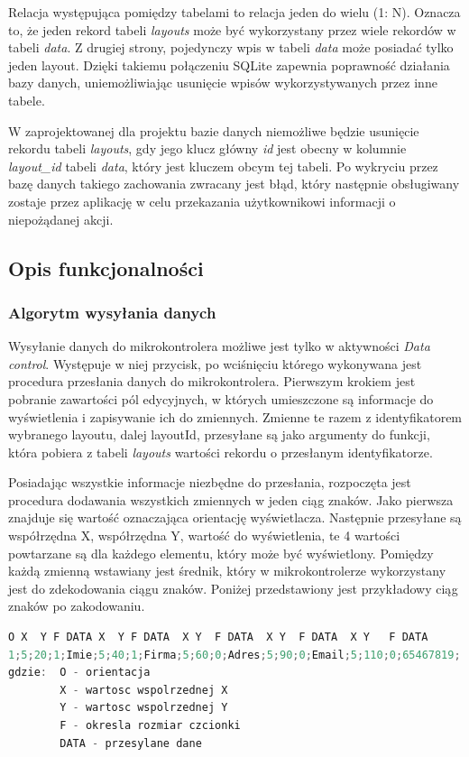 \documentclass[a4paper,12pt, twoside]{article}
\begin{document}
        Relacja występująca pomiędzy tabelami to relacja jeden do wielu (1: N). Oznacza to, że jeden rekord tabeli \textit{layouts} może być wykorzystany przez wiele rekordów w tabeli \textit{data}. Z drugiej strony, pojedynczy wpis w tabeli \textit{data} może posiadać tylko jeden layout. Dzięki takiemu połączeniu SQLite zapewnia poprawność działania bazy danych, uniemożliwiając usunięcie wpisów wykorzystywanych przez inne tabele. 
        
        W zaprojektowanej dla projektu bazie danych niemożliwe będzie usunięcie rekordu tabeli \textit{layouts}, gdy jego klucz główny \textit{id} jest obecny w kolumnie \textit{layout\_id} tabeli \textit{data}, który jest kluczem obcym tej tabeli. Po wykryciu przez bazę danych takiego zachowania zwracany jest błąd, który następnie obsługiwany zostaje przez aplikację w celu przekazania użytkownikowi informacji o niepożądanej akcji.
        
        \subsection{Opis funkcjonalności}
    	
    	\subsubsection{Algorytm wysyłania danych}
    	Wysyłanie danych do mikrokontrolera możliwe jest tylko w aktywności \textit{Data control}. Występuje w niej przycisk, po wciśnięciu którego wykonywana jest procedura przesłania danych do mikrokontrolera. Pierwszym krokiem jest pobranie zawartości pól edycyjnych, w których umieszczone są informacje do wyświetlenia i zapisywanie ich do zmiennych. Zmienne te razem z identyfikatorem wybranego layoutu, dalej layoutId, przesyłane są jako argumenty do funkcji, która pobiera z tabeli \textit{layouts} wartości rekordu o przesłanym identyfikatorze.
    	
    	Posiadając wszystkie informacje niezbędne do przesłania, rozpoczęta jest procedura dodawania wszystkich zmiennych w jeden ciąg znaków. Jako pierwsza znajduje się wartość oznaczająca orientację wyświetlacza. Następnie przesyłane są współrzędna X, współrzędna Y, wartość do wyświetlenia, te 4 wartości powtarzane są dla każdego elementu, który może być wyświetlony. Pomiędzy każdą zmienną wstawiany jest średnik, który w mikrokontrolerze wykorzystany jest do zdekodowania ciągu znaków. Poniżej przedstawiony jest przykładowy ciąg znaków po zakodowaniu.
    	\begin{lstlisting}[language=C++, label={lst:przykladowePrzesylaneDane}, caption=Przykładowy ciąg przesyłanych danych]
O X  Y F DATA X  Y F DATA  X Y  F DATA  X Y  F DATA  X Y   F DATA	
1;5;20;1;Imie;5;40;1;Firma;5;60;0;Adres;5;90;0;Email;5;110;0;65467819;
gdzie:  O - orientacja
        X - wartosc wspolrzednej X
        Y - wartosc wspolrzednej Y
        F - okresla rozmiar czcionki
        DATA - przesylane dane\end{lstlisting}
    
\end{document}
